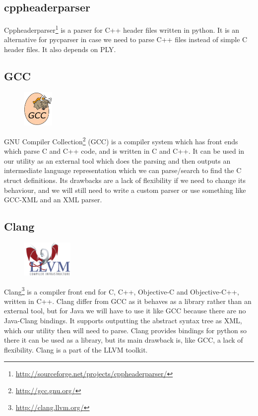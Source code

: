 \subsection{cppheaderparser}
Cppheaderparser\footnote{\url{http://sourceforge.net/projects/cppheaderparser/}}
is a parser for C++ header files written in python. It is an alternative for
pycparser in case we need to parse C++ files instead of simple C header files.
It also depends on PLY.

\subsection{GCC}
\begin{figure}
	\vspace{-20pt}
	\includegraphics[width=1.5cm]{./planning/img/gcc_logo}
	\vspace{-20pt}
\end{figure}
GNU Compiler Collection\footnote{\url{http://gcc.gnu.org/}} (GCC) is a
compiler system which has front ends which parse C and C++ code, and is written
in C and C++. It can be used in our utility as an external tool which does the
parsing and then outputs an intermediate language representation which we can
parse/search to find the C struct definitions. Its drawbacks are a lack of
flexibility if we need to change its behaviour, and we will still need to write
a custom parser or use something like GCC-XML and an XML parser.

\subsection{Clang}
\begin{figure}
	\vspace{-20pt}
	\includegraphics[width=2.5cm]{./planning/img/llvm_logo}
	\vspace{-20pt}
\end{figure}
Clang\footnote{\url{http://clang.llvm.org/}} is a compiler front end for C, 
C++, Objective-C and Objective-C++, written in C++. Clang differ from GCC as it
behaves as a library rather than an external tool, but for Java we will have to
use it like GCC because there are no Java-Clang bindings. It supports
outputting the abstract syntax tree as XML, which our utility then will need to
parse. Clang provides bindings for python so there it can be used as a library,
but its main drawback is, like GCC, a lack of flexibility. Clang is a part of
the LLVM toolkit.


